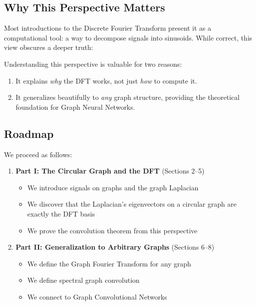 \begin{notechapter}
\subsection{Why This Perspective Matters}

Most introductions to the Discrete Fourier Transform present it as a 
computational tool: a way to decompose signals into sinusoids. While 
correct, this view obscures a deeper truth:

\begin{center}
\end{center}

Understanding this perspective is valuable for two reasons:

\begin{enumerate}
\item It explains \emph{why} the DFT works, not just \emph{how} to 
      compute it.
\item It generalizes beautifully to \emph{any} graph structure, 
      providing the theoretical foundation for Graph Neural Networks.
\end{enumerate}

\subsection{Roadmap}

We proceed as follows:

\begin{enumerate}
\item \textbf{Part I: The Circular Graph and the DFT} (Sections 2--5)
\begin{itemize}
    \item We introduce signals on graphs and the graph Laplacian
    \item We discover that the Laplacian's eigenvectors on a circular 
          graph are exactly the DFT basis
    \item We prove the convolution theorem from this perspective
\end{itemize}

\item \textbf{Part II: Generalization to Arbitrary Graphs} 
      (Sections 6--8)
\begin{itemize}
    \item We define the Graph Fourier Transform for any graph
    \item We define spectral graph convolution
    \item We connect to Graph Convolutional Networks
\end{itemize}


\end{enumerate}
\end{notechapter}
